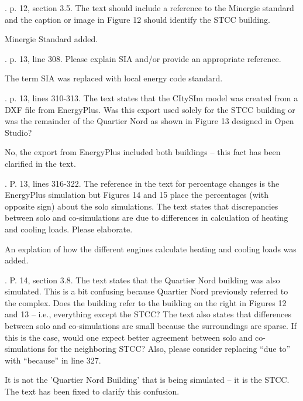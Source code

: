 \documentclass[answers,12pt]{exam}
\begin{document}
\begin{questions}
. p. 12, section 3.5.  The text should include a reference to the Minergie standard and the caption or image in Figure 12 should identify the STCC building. 
\begin{solution}
Minergie Standard added.
\end{solution}

. p. 13, line 308.  Please explain SIA and/or provide an appropriate reference.   
\begin{solution}
The term SIA was replaced with local energy code standard.
\end{solution}

. p. 13, lines 310-313.  The text states that the CItySIm model was created from a DXF file from EnergyPlus.  Was this export used solely for the STCC building or was the remainder of the Quartier Nord as shown in Figure 13 designed in Open Studio? 
\begin{solution}
No, the export from EnergyPlus included both buildings -- this fact has been clarified in the text.
\end{solution}

. P. 13, lines 316-322.  The reference in the text for percentage changes is the EnergyPlus simulation but Figures 14 and 15 place the percentages (with opposite sign) about the solo simulations.  The text states that discrepancies between solo and co-simulations are due to differences in calculation of heating and cooling loads.  Please elaborate. 
\begin{solution}
An explation of how the different engines calculate heating and cooling loads was added.
\end{solution}

. P. 14, section 3.8.  The text states that the Quartier Nord building was also simulated. This is a bit confusing because Quartier Nord previously referred to the complex.  Does the building refer to the building on the right in Figures 12 and 13 – i.e., everything except the STCC?  The text also states that differences between solo and co-simulations are small because the surroundings are sparse.  If this is the case, would one expect better agreement between solo and co-simulations for the neighboring STCC?  Also, please consider replacing “due to” with “because” in line 327. 
\begin{solution}
It is not the 'Quartier Nord Building' that is being simulated -- it is the STCC. The text has been fixed to clarify this confusion.
\end{solution}


\end{questions}
\end{document}
